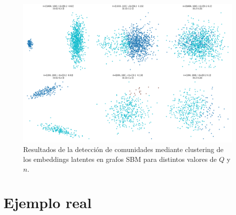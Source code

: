 \documentclass{article}
\begin{document}
\begin{figure}[htb]
    \centering
    \includegraphics[width=0.7\linewidth]{images/comunidades.png}
    \caption{ Resultados de la detección de comunidades mediante clustering de los embeddings latentes en grafos SBM para distintos valores de $Q$ y $n$.}
    \label{fig:comunidades}
\end{figure}


\section{Ejemplo real}

\FloatBarrier


\end{document}
